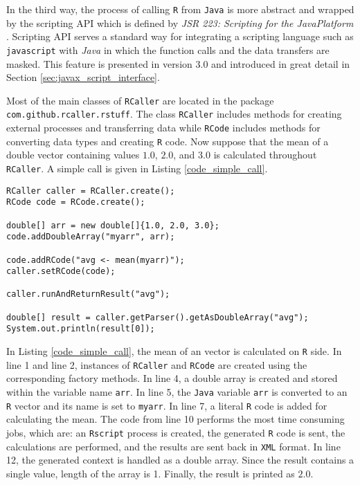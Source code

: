 \documentclass[10pt,a4paper, final, oneside]{article}
\begin{document}
In the third way, the process of calling \texttt{R} from \texttt{Java} is more abstract and wrapped by the scripting API which is defined by \emph{JSR 223: Scripting for the Java\texttrademark Platform} \cite{Friesen2007}. Scripting API serves a standard way for integrating a scripting language such as \texttt{javascript} with \emph{Java} in which the function calls and the data transfers are masked. This feature is presented in version $3.0$ and introduced in great detail in Section \ref{sec:javax_script_interface}.

Most of the main classes of \texttt{RCaller} are located in the package \texttt{com.github.rcaller.rstuff}.
The class \texttt{RCaller} includes methods for creating external processes and transferring data while \texttt{RCode} includes methods for converting data types and creating \texttt{R} code. Now suppose that the mean of a double vector containing values $1.0$, $2.0$, and $3.0$ is calculated throughout \texttt{RCaller}. A simple call is given in Listing \ref{code_simple_call}. 

\begin{minipage}{\linewidth}
\begin{lstlisting}[caption=Simple call,label=code_simple_call]
RCaller caller = RCaller.create();
RCode code = RCode.create();
        
double[] arr = new double[]{1.0, 2.0, 3.0};
code.addDoubleArray("myarr", arr);
        
code.addRCode("avg <- mean(myarr)");
caller.setRCode(code);
        
caller.runAndReturnResult("avg");
        
double[] result = caller.getParser().getAsDoubleArray("avg");
System.out.println(result[0]);
\end{lstlisting}
\end{minipage}

In Listing \ref{code_simple_call}, the mean of an vector is calculated on \texttt{R} side. In line 1 and line 2, instances of \texttt{RCaller} and \texttt{RCode} are created using the corresponding factory methods. In line 4, a double array is created and stored within the variable name \texttt{arr}. In line 5, the \texttt{Java} variable \texttt{arr} is converted to an \texttt{R} vector and its name is set to \texttt{myarr}. In line 7, a literal \texttt{R} code is added for calculating the mean. The code from line 10 performs the most time consuming jobs, which are: an \texttt{Rscript} process is created, the generated \texttt{R} code is sent, the calculations are performed, and the results are sent back in \texttt{XML} format. In line 12, the generated context is handled as a double array. Since the result contains a single value, length of the array is 1. Finally, the result is printed as $2.0$. 
\end{document}
